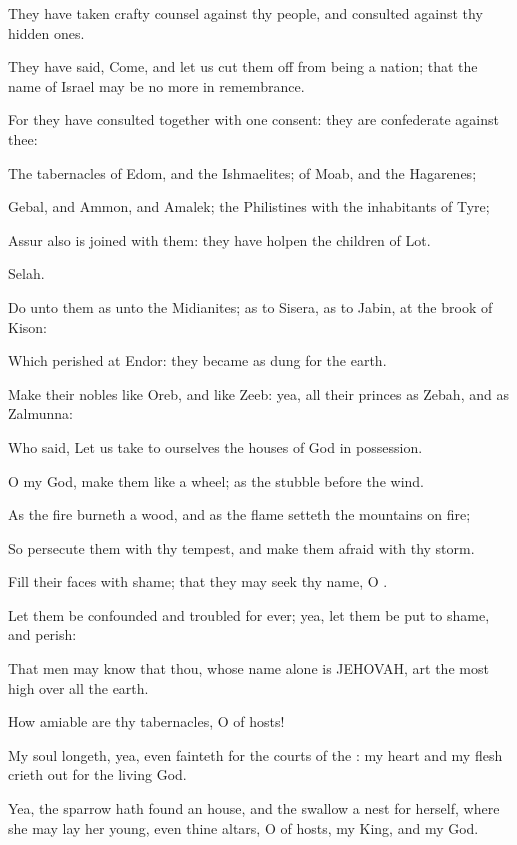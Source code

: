 \Verse They have taken crafty counsel against thy people, and consulted against thy hidden ones.

\Verse They have said, Come, and let us cut them off from being a nation; that the name of Israel may be no more in remembrance.

\Verse For they have consulted together with one consent: they are confederate against thee:

\Verse The tabernacles of Edom, and the Ishmaelites; of Moab, and the Hagarenes;

\Verse Gebal, and Ammon, and Amalek; the Philistines with the inhabitants of Tyre;

\Verse Assur also is joined with them: they have holpen the children of Lot.

Selah.

\Verse Do unto them as unto the Midianites; as to Sisera, as to Jabin, at the brook of Kison:

\Verse Which perished at Endor: they became as dung for the earth.

\Verse Make their nobles like Oreb, and like Zeeb: yea, all their princes as Zebah, and as Zalmunna:

\Verse Who said, Let us take to ourselves the houses of God in possession.

\Verse O my God, make them like a wheel; as the stubble before the wind.

\Verse As the fire burneth a wood, and as the flame setteth the mountains on fire;

\Verse So persecute them with thy tempest, and make them afraid with thy storm.

\Verse Fill their faces with shame; that they may seek thy name, O \LORD.

\Verse Let them be confounded and troubled for ever; yea, let them be put to shame, and perish:

\Verse That men may know that thou, whose name alone is JEHOVAH, art the most high over all the earth.




\Chapter
\Verse How amiable are thy tabernacles, O \LORD of hosts!

\Verse My soul longeth, yea, even fainteth for the courts of the \LORD: my heart and my flesh crieth out for the living God.

\Verse Yea, the sparrow hath found an house, and the swallow a nest for herself, where she may lay her young, even thine altars, O \LORD of hosts, my King, and my God.

